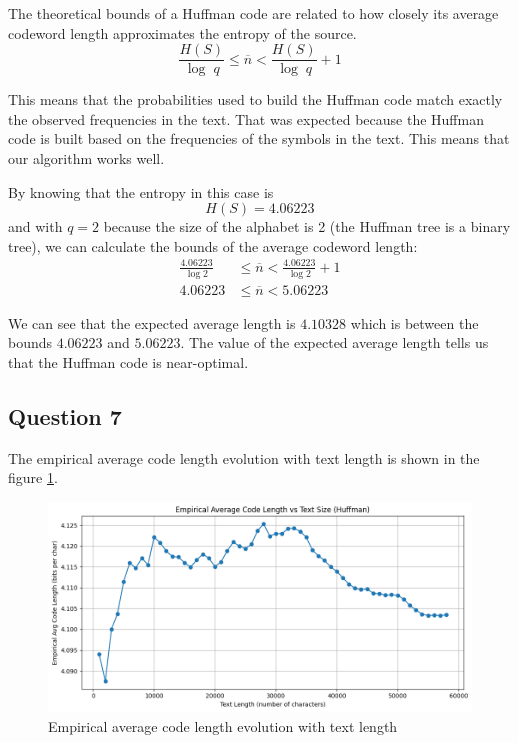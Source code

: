 \documentclass[]{template}
\begin{document}
    \noindent
    The theoretical bounds of a Huffman code are related to how closely its average codeword 
    length approximates the entropy of the source.
    \[
        \frac{H(S)}{\log \; q} \leq \overline{n} < \frac{H(S)}{\log \; q} + 1 
    \]

    \noindent
    This means that the probabilities used to build the Huffman code match exactly the observed frequencies in the text.
    That was expected because the Huffman code is built based on the frequencies of the symbols in the text.
    This means that our algorithm works well.

    \noindent
    By knowing that the entropy in this case is \[H(S) = 4.06223\] and 
    with $q = 2$ because the size of the alphabet is 2 (the Huffman tree is a binary tree), we can calculate the bounds of the average codeword length:
    \begin{align*}
        \frac{4.06223}{\log 2} &\leq \overline{n} < \frac{4.06223}{\log 2} + 1 \\
        4.06223 &\leq \overline{n} < 5.06223
    \end{align*}
    
    \noindent
    We can see that the expected average length is $4.10328$ which is between the bounds $4.06223$ and $5.06223$.
    The value of the expected average length tells us that the Huffman code is near-optimal.

    \subsection{Question 7}

    The empirical average code length evolution with text length is shown in the figure 
    \ref{fig:evolution_avg_code_length}.\\
    
    \begin{figure}[ht]
        \centering
        \includegraphics[width=1\textwidth]{Images/evolution_avg_code_length.png}
        \caption{Empirical average code length evolution with text length}\label{fig:evolution_avg_code_length}
    \end{figure}
\end{document}
